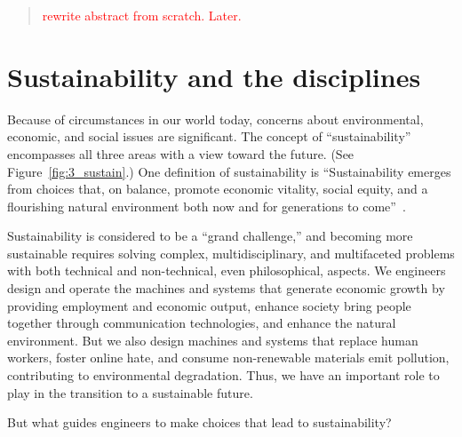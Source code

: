 \documentclass[12pt]{article}
\date{}                           %
\newcommand{\ins}[1]{\textcolor{red}{#1}}
\begin{document}
	
\maketitle

\begin{abstract}
\noindent
\ins{rewrite abstract from scratch. Later.}

\end{abstract}


\section{Sustainability and the disciplines}
\label{sec:sustainability_and_the_disciplines}

Because of circumstances in our world today, 
concerns about environmental, economic, and social 
issues are significant. 
The concept of ``sustainability'' encompasses all three areas
with a view toward the future. 
(See Figure~\ref{fig:3_sustain}.)
One definition of sustainability is
``Sustainability emerges from choices that, on balance, 
promote economic vitality, social equity, and a flourishing natural environment 
both now and for generations to come''~\autocite{Calvin-College-2017}.

Sustainability is considered to be a ``grand challenge,'' 
and becoming more sustainable requires solving 
complex, multidisciplinary, and multifaceted problems
with both technical and non-technical, even philosophical, aspects. 
We engineers design and operate the machines and systems that
generate economic growth by providing employment and economic output, 
enhance society bring people together through communication technologies, and
enhance the natural environment.
But we also design machines and systems that
replace human workers, 
foster online hate, 
and  
consume non-renewable materials
emit pollution, contributing to environmental degradation.
Thus, we have an important role to play in the transition to a sustainable future. 

But what guides engineers to make choices that lead to sustainability?
\end{document}
